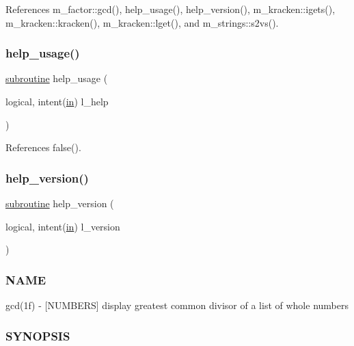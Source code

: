 References m\+\_\+factor\+::gcd(), help\+\_\+usage(), help\+\_\+version(), m\+\_\+kracken\+::igets(), m\+\_\+kracken\+::kracken(), m\+\_\+kracken\+::lget(), and m\+\_\+strings\+::s2vs().

\mbox{\label{gcd_8f90_a3e09a3b52ee8fb04eeb93fe5761626a8}} 
\subsubsection{\texorpdfstring{help\+\_\+usage()}{help\_usage()}}
{\footnotesize\ttfamily \hyperlink{M__stopwatch_83_8txt_acfbcff50169d691ff02d4a123ed70482}{subroutine} help\+\_\+usage (\begin{DoxyParamCaption}\item[{logical, intent(\hyperlink{M__journal_83_8txt_afce72651d1eed785a2132bee863b2f38}{in})}]{l\+\_\+help }\end{DoxyParamCaption})}



References false().

\mbox{\label{gcd_8f90_a39c21619b08a3c22f19e2306efd7f766}} 
\subsubsection{\texorpdfstring{help\+\_\+version()}{help\_version()}}
{\footnotesize\ttfamily \hyperlink{M__stopwatch_83_8txt_acfbcff50169d691ff02d4a123ed70482}{subroutine} help\+\_\+version (\begin{DoxyParamCaption}\item[{logical, intent(\hyperlink{M__journal_83_8txt_afce72651d1eed785a2132bee863b2f38}{in})}]{l\+\_\+version }\end{DoxyParamCaption})}



\subsubsection*{N\+A\+ME}

gcd(1f) -\/ \mbox{[}N\+U\+M\+B\+E\+RS\mbox{]} display greatest common divisor of a list of whole numbers 

\subsubsection*{S\+Y\+N\+O\+P\+S\+IS}

